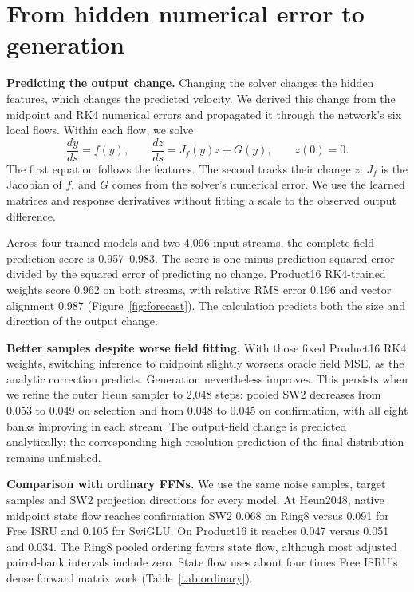 \documentclass[11pt]{article}
\begin{document}
\section{From hidden numerical error to generation}
\textbf{Predicting the output change.} Changing the solver changes the hidden
features, which changes the predicted velocity. We derived this change from
the midpoint and RK4 numerical errors and propagated it through the network's
six local flows. Within each flow, we solve
\begin{equation}
\frac{dy}{ds}=f(y),\qquad
\frac{dz}{ds}=J_f(y)z+G(y),\qquad z(0)=0.
\label{eq:response}
\end{equation}
The first equation follows the features. The second tracks their change $z$:
$J_f$ is the Jacobian of $f$, and $G$ comes from the solver's numerical error.
We use the learned matrices and response derivatives without fitting a scale
to the observed output difference.

Across four trained models and two 4,096-input streams, the complete-field
prediction score is 0.957--0.983. The score is one minus prediction squared
error divided by the squared error of predicting no change. Product16
RK4-trained weights score 0.962 on both streams, with relative RMS error
0.196 and vector alignment 0.987 (Figure~\ref{fig:forecast}). The calculation
predicts both the size and direction of the output change.

\textbf{Better samples despite worse field fitting.} With those fixed
Product16 RK4 weights, switching inference to midpoint slightly worsens
oracle field MSE, as the analytic correction predicts. Generation nevertheless
improves. This persists when we refine the outer Heun sampler to 2,048
steps: pooled SW2 decreases from 0.053 to 0.049 on selection and from 0.048 to
0.045 on confirmation, with all eight banks improving in each stream. The
output-field change is predicted analytically; the corresponding
high-resolution prediction of the final distribution remains unfinished.

\textbf{Comparison with ordinary FFNs.} We use the same noise samples, target
samples and SW2 projection directions for every model. At Heun2048,
native midpoint state flow reaches confirmation SW2 0.068 on Ring8 versus
0.091 for Free ISRU and 0.105 for SwiGLU. On Product16 it reaches 0.047 versus
0.051 and 0.034. The Ring8 pooled ordering favors state flow, although most
adjusted paired-bank intervals include zero. State flow uses about four times
Free ISRU's dense forward matrix work (Table~\ref{tab:ordinary}).
\end{document}
